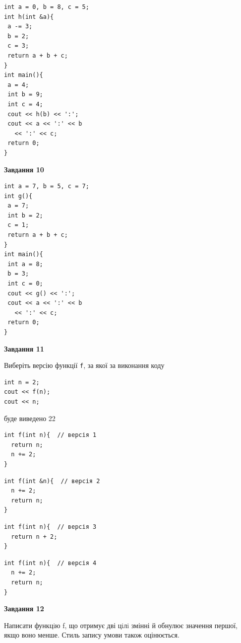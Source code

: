 \documentclass[12pt, ukrainian]{article}
\def\code#1{\Verb!#1!}
\begin{document}
{\begin {large}
\begin{minipage}[t]{7.0cm}
\begin{verbatim}
int a = 0, b = 8, c = 5;
int h(int &a){
 a -= 3;
 b = 2;
 c = 3;
 return a + b + c;
}
int main(){
 a = 4;
 int b = 9;
 int c = 4;
 cout << h(b) << ':';
 cout << a << ':' << b 
   << ':' << c;
 return 0;
}
\end{verbatim}



\begin{center}
\textbf{Завдання 10}
\end{center}
\vspace{-8mm}

\begin{verbatim}
int a = 7, b = 5, c = 7;
int g(){
 a = 7;
 int b = 2;
 c = 1;
 return a + b + c;
}
int main(){
 int a = 8;
 b = 3;
 int c = 0;
 cout << g() << ':';
 cout << a << ':' << b 
   << ':' << c;
 return 0;
}
\end{verbatim}

\end{minipage}
\vline \hspace{1mm}
\begin{minipage}[t]{11.0cm}

\begin{center}
\textbf{Завдання 11}
\end{center}
Виберіть версію функції \code{f}, за якої за виконання коду
\begin{verbatim}
int n = 2;
cout << f(n);
cout << n;
\end{verbatim}

буде виведено 22

\begin{verbatim}
int f(int n){  // версія 1
  return n;
  n += 2;
}
\end{verbatim}

\vspace{-8mm}\begin{verbatim}
int f(int &n){  // версія 2
  n += 2;
  return n;
}
\end{verbatim}

\vspace{-8mm}\begin{verbatim}
int f(int n){  // версія 3
  return n + 2;
}
\end{verbatim}

\vspace{-8mm}\begin{verbatim}
int f(int n){  // версія 4
  n += 2;
  return n;
}
\end{verbatim}



\begin{center}
\textbf{Завдання 12}
\end{center}

Написати функцiю f, що отримує дві цiлi змінні й обнулює значення першої, якщо воно менше. Стиль запису умови також оцінюється.\par

\end{minipage}

\end {large}}
\newpage
\end{document}
